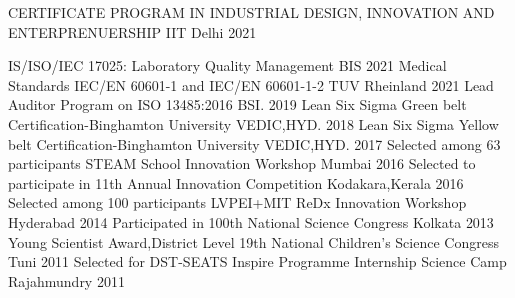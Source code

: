 \begin{cvhonors}
 \cvhonor
    {CERTIFICATE PROGRAM IN INDUSTRIAL DESIGN, INNOVATION AND ENTERPRENUERSHIP
}
    {}
    {IIT Delhi }
    {2021}

 \cvhonor
    {IS/ISO/IEC 17025: Laboratory Quality Management
}
    {}
    {BIS }
    {2021}
 \cvhonor
    {Medical Standards IEC/EN 60601-1 and IEC/EN 60601-1-2
}
    {}
    {TUV Rheinland}
    {2021}
  \cvhonor
    {Lead Auditor Program on ISO 13485:2016}
    {}
    {BSI.}
    {2019}
  \cvhonor
    {Lean Six Sigma Green belt Certification-Binghamton University}
    {}
    {VEDIC,HYD.}
    {2018}
\cvhonor
    {Lean Six Sigma Yellow belt Certification-Binghamton University}
    {}
    {VEDIC,HYD.}
    {2017}
  \cvhonor
    {Selected among 63 participants STEAM School Innovation Workshop }
    {}
    {Mumbai}
    {2016}
 \cvhonor
    {Selected to participate in 11th Annual Innovation Competition }
    {}
    {Kodakara,Kerala}
    {2016}
  \cvhonor
    {Selected among 100 participants LVPEI+MIT ReDx Innovation Workshop}
    {}
    {Hyderabad}
    {2014}
  \cvhonor
    {Participated in 100th National Science Congress}
    {}
    { Kolkata}
    {2013}
 \cvhonor
    {Young Scientist Award,District Level 19th National Children's Science Congress}
    {}
    { Tuni}
    {2011}
 \cvhonor
    {Selected for DST-SEATS Inspire Programme Internship Science Camp}
    {}
    { Rajahmundry}
    {2011}
\end{cvhonors}

